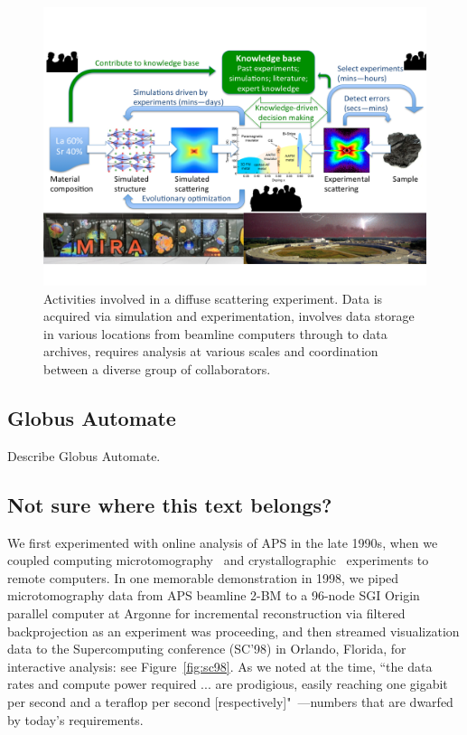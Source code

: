 \documentclass{aip-cp}
\newcommand\kyle[1]{}
\newcommand\kyle[1]{{\color{purple}[Kyle: #1]}}
\begin{document}
\begin{figure}[h]
  \centerline{\includegraphics[width=6in,trim=0 2.6in 0 1.5in,clip]{Figs/diffuse.png}}
  \caption{Activities involved in a diffuse scattering experiment. Data is acquired
   via simulation and experimentation, involves data storage in various locations
from beamline computers through to data archives, requires analysis at various scales
and coordination between a diverse group of collaborators.
\label{fig:diffuse}}
\end{figure}

\subsection{Globus Automate}

Describe Globus Automate. 

\subsection{Not sure where this text belongs?}
\kyle{Following text needs to go somewhere}
We first experimented with online analysis of APS in the late 1990s, 
when we coupled 
computing microtomography~\cite{wang1999quasi,wang2001high} and crystallographic~\cite{von2000using}
experiments to remote computers.
In one memorable demonstration in 1998, we piped microtomography data from APS beamline 2-BM to a 96-node SGI Origin parallel computer 
at Argonne for incremental reconstruction via filtered backprojection as an experiment was proceeding,
and then streamed visualization data to the Supercomputing conference (SC'98) in Orlando, Florida, 
for interactive analysis: see Figure~\ref{fig:sc98}. 
As we noted at the time, 
``the data rates and compute power required ... are prodigious, easily reaching one gigabit per second and a teraflop per second [respectively]"~\cite{von2000real}---numbers that are dwarfed by today's requirements. 
\end{document}
